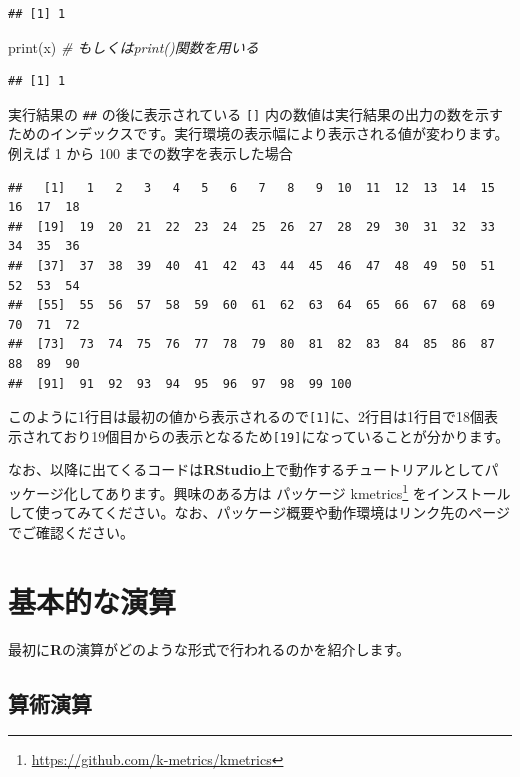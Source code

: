 \documentclass[
  12pt,
]{book}
\newenvironment{Shaded}{\begin{snugshade}}{\end{snugshade}}
\newcommand{\CommentTok}[1]{\textcolor[rgb]{0.56,0.35,0.01}{\textit{#1}}}
\newcommand{\FunctionTok}[1]{\textcolor[rgb]{0.00,0.00,0.00}{#1}}
\newcommand{\NormalTok}[1]{#1}
\DeclareRobustCommand{\href}[2]{#2\footnote{\url{#1}}}
\begin{document}
\begin{verbatim}
## [1] 1
\end{verbatim}

\begin{Shaded}
\begin{Highlighting}[]
\FunctionTok{print}\NormalTok{(x)      }\CommentTok{\# もしくはprint()関数を用いる}
\end{Highlighting}
\end{Shaded}

\begin{verbatim}
## [1] 1
\end{verbatim}

実行結果の \texttt{\#\#} の後に表示されている \texttt{{[}{]}} 内の数値は実行結果の出力の数を示すためのインデックスです。実行環境の表示幅により表示される値が変わります。例えば 1 から 100 までの数字を表示した場合

\begin{verbatim}
##   [1]   1   2   3   4   5   6   7   8   9  10  11  12  13  14  15  16  17  18
##  [19]  19  20  21  22  23  24  25  26  27  28  29  30  31  32  33  34  35  36
##  [37]  37  38  39  40  41  42  43  44  45  46  47  48  49  50  51  52  53  54
##  [55]  55  56  57  58  59  60  61  62  63  64  65  66  67  68  69  70  71  72
##  [73]  73  74  75  76  77  78  79  80  81  82  83  84  85  86  87  88  89  90
##  [91]  91  92  93  94  95  96  97  98  99 100
\end{verbatim}

このように1行目は最初の値から表示されるので\texttt{{[}1{]}}に、2行目は1行目で18個表示されており19個目からの表示となるため\texttt{{[}19{]}}になっていることが分かります。

なお、以降に出てくるコードは\textbf{RStudio}上で動作するチュートリアルとしてパッケージ化してあります。興味のある方は \href{https://github.com/k-metrics/kmetrics}{パッケージ kmetrics} をインストールして使ってみてください。なお、パッケージ概要や動作環境はリンク先のページでご確認ください。

\hypertarget{ux57faux672cux7684ux306aux6f14ux7b97}{%
\section{基本的な演算}\label{ux57faux672cux7684ux306aux6f14ux7b97}}

最初に\textbf{R}の演算がどのような形式で行われるのかを紹介します。

\hypertarget{ux7b97ux8853ux6f14ux7b97}{%
\subsection{算術演算}\label{ux7b97ux8853ux6f14ux7b97}}
\end{document}
